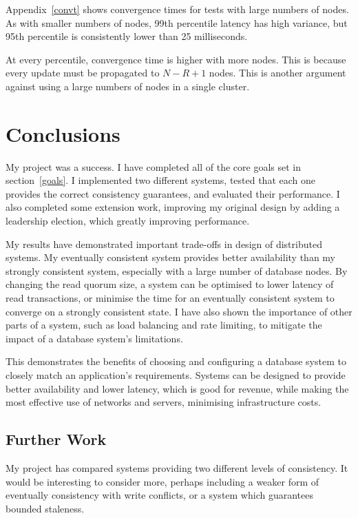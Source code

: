 \documentclass[12pt,a4paper,twoside,openany]{report}
\begin{document}
Appendix~\ref{convt} shows convergence times for tests with large numbers of nodes. As with smaller numbers of nodes, 99th percentile latency has high variance, but 95th percentile is consistently lower than 25 milliseconds.

At every percentile, convergence time is higher with more nodes. This is because every update must be propagated to $N - R + 1$ nodes. This is another argument against using a large numbers of nodes in a single cluster.

\chapter{Conclusions}

My project was a success. I have completed all of the core goals set in section~\ref{goals}. I implemented two different systems, tested that each one provides the correct consistency guarantees, and evaluated their performance. I also completed some extension work, improving my original design by adding a leadership election, which greatly improving performance.

My results have demonstrated important trade-offs in design of distributed systems. My eventually consistent system provides better availability than my strongly consistent system, especially with a large number of database nodes. By changing the read quorum size, a system can be optimised to lower latency of read transactions, or minimise the time for an eventually consistent system to converge on a strongly consistent state. I have also shown the importance of other parts of a system, such as load balancing and rate limiting, to mitigate the impact of a database system's limitations. 

This demonstrates the benefits of choosing and configuring a database system to closely match an application's requirements. Systems can be designed to provide better availability and lower latency, which is good for revenue, while making the most effective use of networks and servers, minimising infrastructure costs.

\section*{Further Work}

My project has compared systems providing two different levels of consistency. It would be interesting to consider more, perhaps including a weaker form of eventually consistency with write conflicts, or a system which guarantees bounded staleness.
\end{document}
